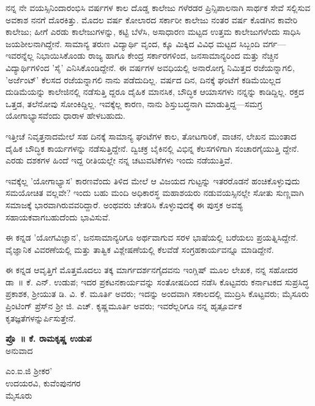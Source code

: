 ನನ್ನ  ನೇ ವಯಸ್ಸಿನಿಂದಾರಂಭಿಸಿ  ವರ್ಷಗಳ ಕಾಲ ದೊಡ್ಡ ಕಾಲೇಜು ಗಳೆರಡರ ಪ್ರಿನ್ಸಿಪಾಲನಾಗಿ ಸಾರ್ಥಕ ಸೇವೆ ಸಲ್ಲಿಸುವ ಅವಕಾಶ ನನಗೆ ದೊರಕಿತ್ತು. ಮೊದಲ  ವರ್ಷ ಕೋಲಾರದ ಸರ್ಕಾರೀ ಕಾಲೇಜು ನಂತರ  ವರ್ಷ ಕೊಡಗಿನ ಕಾವೇರಿ ಕಾಲೇಜು; ಹೀಗೆ ಎರಡು ಕಾಲೇಜುಗಳನ್ನು, ಕಟ್ಟಿ ಬೆಳೆಸಿ, ಅಸಾಧಾರಣ ಮಟ್ಟದ ಉತ್ತಮ ಕಾಲೇಜುಗಳೆಂದು ಸಾಧಿಸಿ ಜಯಶೀಲನಾಗಿದ್ದೇನೆ. ಸಾಮಾನ್ಯ  ತರುಣ ವಿದ್ಯಾರ್ಥಿ ವೃಂದ,  ಕ್ಕೂ ಮಿಕ್ಕಿದ ವಿವಿಧ ಮಟ್ಟದ ಸಿಬ್ಬಂದಿ ವರ್ಗ—ಇವರನ್ನೆಲ್ಲ ನಿಭಾಯಿಸಿಕೊಂಡು ರಾಜ್ಯ ಹಾಗೂ ಕೇಂದ್ರ ಸರ್ಕಾರಗಳಿಂದ, ಜನಸಾಮಾನ್ಯರಿಂದ ಮತ್ತು ನೆಚ್ಚಿನ ವಿದ್ಯಾರ್ಥಿಗಳಿಂದ 'ಸೈ' ಎನಿಸಿಕೊಂಡಿದ್ದೇನೆ. ಈ  ವರ್ಷಗಳ ಅವಧಿಯಲ್ಲಿ ಅನಾರೋಗ್ಯ ನಿಮಿತ್ತದ ರಜೆಯನ್ನಾಗಲಿ, 'ಅರ್ಜೆಂಟ್​' ಕೆಲಸದ ರಜೆಯನ್ನಾಗಲಿ ನಾನು ಪಡೆದುದಿಲ್ಲ. ವರ್ಷದ  ದಿನ, ದಿನಕ್ಕೆ  ಘಂಟೆಗೆ ಕಡಿಮೆಯಿಲ್ಲದ ದುಡಿಮೆಯನ್ನು ಕಾಲೇಜಿನಲ್ಲಿ ನಡೆಸುತ್ತಿ ದ್ದರೂ ದೈಹಿಕ ಮಾನಸಿಕ, ಬೌದ್ಧಿಕ ಆಯಾಸಗಳು ನನ್ನನ್ನು ಕಾಡಿದ್ದಿಲ್ಲ. ರಕ್ತದ ಒತ್ತಡ, ತಲೆನೋವು ಸೋಂಕಿದ್ದಿಲ್ಲ. ಇವಕ್ಕೆಲ್ಲ ಕಾರಣ, ನಾನು ಶಿಸ್ತುಬದ್ಧನಾಗಿ ಮಾಡುತ್ತಿದ್ದ—ಸಮಗ್ರ ಯೋಗಾಭ್ಯಾಸವೆಂದು ಧಾರಾಳ ಹೇಳಬಹುದು.

ಇತ್ತೀಚೆ ನಿವೃತ್ತನಾದಮೇಲೆ ಸಹ ದಿನಕ್ಕೆ ಸಾಮಾನ್ಯ  ಘಂಟೆಗಳ ಕಾಲ, ತೋಟಗಾರಿಕೆ, ವಾಚನ, ಲೇಖನ ಮುಂತಾದ ದೈಹಿಕ ಬೌದ್ಧಿಕ ಕಾರ್ಯಗಳನ್ನು ನಡೆಸುತ್ತಿದ್ದೇನೆ. ದ್ವಿಚಕ್ರ ಬೈಕಿನಲ್ಲಿ ವಿಭಿನ್ನ ಕೆಲಸಗಳಿಗಾಗಿ ಸಂಚಾರಗೈಯುತ್ತಿ ದ್ದೇನೆ. ಎರಡು ದಶಕಗಳ ಹಿಂದೆ ಇದ್ದ ರೀತಿಯಲ್ಲೇ ನನ್ನ ಚಟುವಟಿಕೆಗಳು ಇಂದು ನಡೆಯುತ್ತಿವೆ.

ಇವಕ್ಕೆಲ್ಲ 'ಯೋಗಾಭ್ಯಾಸ' ಕಾರಣವೆಂದು ತಿಳಿದ ಮೇಲೆ ಆ ವಿಜಯದ ಗುಟ್ಟನ್ನು  ಇತರರೊಡನೆ ಹಂಚಿಕೊಳ್ಳುವುದು ಸಮಯೋಚಿತ ವಲ್ಲವೇ? ಇಂದು ಬಹು ಮಂದಿ ಅಧಿಕಾರಸ್ಥ ಮಹಾಶಯರು ನಡುವಯಸ್ಸಿನಲ್ಲೇ ಸೋತು ಸುಣ್ಣವಾಗಿ ಸಮಾಜಕ್ಕೆ ಭಾರವಾಗಿರುವವರಿದ್ದಾರೆ. ಅಂಥವರು ಚೇತರಿಸಿ ಕೊಳ್ಳುವುದಕ್ಕೆ ಈ ಪುಸ್ತಕ ಅವಶ್ಯ ಸಹಾಯಕವಾಗಬಹುದೆಂದು ಭಾವಿಸುವೆ.

ಈ ಕನ್ನಡ 'ಯೋಗವಿಜ್ಞಾನ', ಜನಸಾಮಾನ್ಯರಿಗೂ ಅರ್ಥವಾಗುವ ಸರಳ ಭಾಷೆಯಲ್ಲಿ ಬರೆಯಲು ಪ್ರಯತ್ನಿಸಿದ್ದೇನೆ. ವೈಜ್ಞಾನಿಕ ವಿವರಣೆಯಲ್ಲಿ ಮತ್ತು ತಾತ್ವಿಕ ವಿಶ್ಲೇಷಣೆಯಲ್ಲಿ ಕೆಲವೆಡೆ ಸಂಗ್ರಹಕಾರ್ಯವನ್ನೂ ಮಾಡಿದ್ದೇನೆ.

ಈ ಕನ್ನಡ ಆವೃತ್ತಿಗೆ ಮೊತ್ತಮೊದಲು ತಕ್ಕ ಮಾರ್ಗದರ್ಶನಗೈದವನು ಇಂಗ್ಲಿಷ್ ಮೂಲ ಲೇಖಕ, ನನ್ನ ಸಹೋದರ ಡಾ~॥ ಕೆ. ಎನ್. ಉಡುಪ; ಇದರ ಪ್ರಕಟನಕಾರ್ಯವನ್ನು ಸಂತೋಷದಿಂದ ನಡೆಸಿ ಕೊಟ್ಟವರು ಕರ್ನಾಟಕದ ಸುಪ್ರಸಿದ್ಧ ಪ್ರಕಾಶಕ, ಶ‍್ರೀಯುತ ಡಿ. ವಿ. ಕೆ. ಮೂರ್ತಿ ಅವರು; ಇದನ್ನು ಅಂದವಾಗಿ ಸಕಾಲದಲ್ಲಿ ಮುದ್ರಿಸಿ ಕೊಟ್ಟವರು; ಮೈಸೂರು ಪ್ರಿಂಟಿಂಗ್ ಪ್ರೆಸ್​ನ ಶ‍್ರೀ ಜಿ. ಎಚ್. ಕೃಷ್ಣಮೂರ್ತಿ ಅವರು; ಇವರೆಲ್ಲರಿಗೂ ನನ್ನ ಹೃತ್ಪೂರ್ವಕ ಕೃತಜ್ಞತೆಗಳನ್ನುರ್ಪಿಸುತ್ತೇನೆ.

\begin{flushright}
\textbf{ಪ್ರೊ~॥ ಕೆ. ರಾಮಕೃಷ್ಣ ಉಡುಪ}\\ಅನುವಾದ
\end{flushright}

ಎಂ.ಐ.ಜಿ  ಶ‍್ರೀಕರ'\\ಉದಯರವಿ, ಕುವೆಂಪುನಗರ\\ಮೈಸೂರು 

